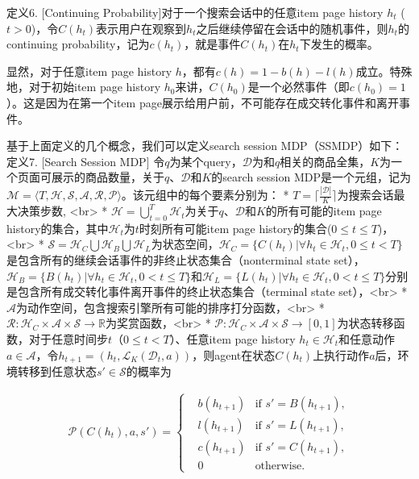 定义6. [Continuing Probability]对于一个搜索会话中的任意item page history $h_t$ ($t > 0$)，令$C(h_t)$表示用户在观察到$h_t$之后继续停留在会话中的随机事件，则$h_t$的continuing probability，记为$c(h_t)$，就是事件$C(h_t)$在$h_t$下发生的概率。

显然，对于任意item page history $h$，都有$c(h) = 1 - b(h) - l(h)$成立。特殊地，对于初始item page history $h_0$来讲，$C(h_0)$是一个必然事件（即$c(h_0) = 1$）。这是因为在第一个item page展示给用户前，不可能存在成交转化事件和离开事件。 

基于上面定义的几个概念，我们可以定义search session MDP（SSMDP）如下：
定义7. [Search Session MDP]
令$q$为某个query，$\mathcal{D}$为和$q$相关的商品全集，$K$为一个页面可展示的商品数量，关于$q$、$\mathcal{D}$和$K$的search session MDP是一个元组，记为$\mathcal{M} = \langle T, \mathcal{H}, \mathcal{S}, \mathcal{A}, \mathcal{R}, \mathcal{P} \rangle$。该元组中的每个要素分别为：
* $T = \lceil \frac{|\mathcal{D}|}{K} \rceil$为搜索会话最大决策步数, <br>
* $\mathcal{H} = \bigcup_{t=0}^T \mathcal{H}_t$为关于$q$、$\mathcal{D}$和$K$的所有可能的item page history的集合，其中$\mathcal{H}_t$为$t$时刻所有可能item page history的集合($0 \leq t \leq T$)，<br>
* $\mathcal{S} = \mathcal{H}_C \bigcup \mathcal{H}_B \bigcup \mathcal{H}_L$为状态空间，$\mathcal{H}_C = \{ C(h_t) | \forall h_t \in \mathcal{H}_t, 0 \leq t < T \}$是包含所有的继续会话事件的非终止状态集合（nonterminal state set），$\mathcal{H}_B = \{ B(h_t) | \forall h_t \in \mathcal{H}_t, 0 < t \leq T \}$和$\mathcal{H}_L = \{ L(h_t) | \forall h_t \in \mathcal{H}_t, 0 < t \leq T \}$分别是包含所有成交转化事件离开事件的终止状态集合（terminal state set），<br>
* $\mathcal{A}$为动作空间，包含搜索引擎所有可能的排序打分函数，<br>
* $\mathcal{R} : \mathcal{H}_C \times \mathcal{A} \times \mathcal{S} \rightarrow \mathbb{R}$为奖赏函数，<br>
* $\mathcal{P} : \mathcal{H}_C \times \mathcal{A} \times \mathcal{S} \rightarrow [0,1]$为状态转移函数，对于任意时间步$t$（$0 \leq t < T$）、任意item page history $h_t \in \mathcal{H}_t$和任意动作$a \in \mathcal{A}$，令$h_{t+1} = (h_t, \mathcal{L}_K(\mathcal{D}_t, a))$，则agent在状态$C(h_t)$上执行动作$a$后，环境转移到任意状态$s' \in \mathcal{S}$的概率为

\begin{align}
 \mathcal{P}(C(h_t), a, s') = \left\{
\begin{aligned}
&b(h_{t+1}) &\text{if } s' = B(h_{t+1}), \\
&l(h_{t+1}) &\text{if } s' = L(h_{t+1}), \\
&c(h_{t+1}) &\text{if } s' = C(h_{t+1}), \\
&0 &\text{otherwise.}
\end{aligned}
\right. 
\end{align}

